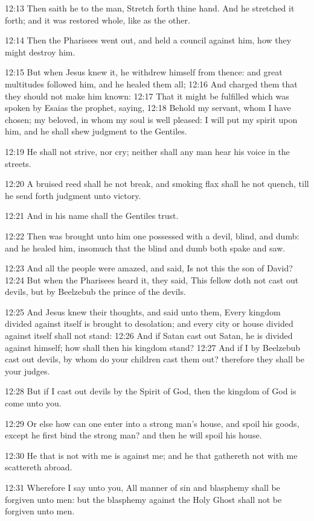 12:13 Then saith he to the man, Stretch forth thine hand. And he
stretched it forth; and it was restored whole, like as the other.

12:14 Then the Pharisees went out, and held a council against him, how
they might destroy him.

12:15 But when Jesus knew it, he withdrew himself from thence: and
great multitudes followed him, and he healed them all; 12:16 And
charged them that they should not make him known: 12:17 That it might
be fulfilled which was spoken by Esaias the prophet, saying, 12:18
Behold my servant, whom I have chosen; my beloved, in whom my soul is
well pleased: I will put my spirit upon him, and he shall shew
judgment to the Gentiles.

12:19 He shall not strive, nor cry; neither shall any man hear his
voice in the streets.

12:20 A bruised reed shall he not break, and smoking flax shall he not
quench, till he send forth judgment unto victory.

12:21 And in his name shall the Gentiles trust.

12:22 Then was brought unto him one possessed with a devil, blind, and
dumb: and he healed him, insomuch that the blind and dumb both spake
and saw.

12:23 And all the people were amazed, and said, Is not this the son of
David?  12:24 But when the Pharisees heard it, they said, This fellow
doth not cast out devils, but by Beelzebub the prince of the devils.

12:25 And Jesus knew their thoughts, and said unto them, Every kingdom
divided against itself is brought to desolation; and every city or
house divided against itself shall not stand: 12:26 And if Satan cast
out Satan, he is divided against himself; how shall then his kingdom
stand?  12:27 And if I by Beelzebub cast out devils, by whom do your
children cast them out? therefore they shall be your judges.

12:28 But if I cast out devils by the Spirit of God, then the kingdom
of God is come unto you.

12:29 Or else how can one enter into a strong man's house, and spoil
his goods, except he first bind the strong man? and then he will spoil
his house.

12:30 He that is not with me is against me; and he that gathereth not
with me scattereth abroad.

12:31 Wherefore I say unto you, All manner of sin and blasphemy shall
be forgiven unto men: but the blasphemy against the Holy Ghost shall
not be forgiven unto men.

